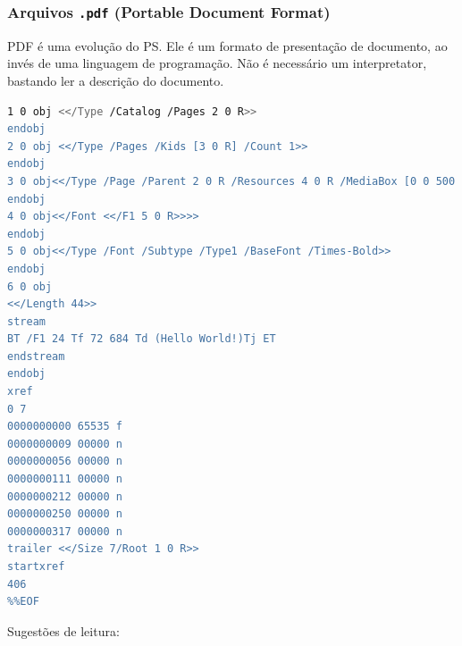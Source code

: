 \begin{frame}
\frametitle{Arquivos \texttt{.pdf} (Portable Document Format)}
PDF é uma evolução do PS. Ele é um formato de presentação de documento, ao invés de uma linguagem de programação.
Não é necessário um interpretator, bastando ler a descrição do documento.

\begin{lstlisting}[language=bash, label=lst-pdf, caption={Exemplo `Hello World!'.}, postbreak=\mbox{$\hookrightarrow$\space}, basicstyle=\fontsize{7}{9}\selectfont\ttfamily]
%PDF-1.4
1 0 obj <</Type /Catalog /Pages 2 0 R>>
endobj
2 0 obj <</Type /Pages /Kids [3 0 R] /Count 1>>
endobj
3 0 obj<</Type /Page /Parent 2 0 R /Resources 4 0 R /MediaBox [0 0 500 800] /Contents 6 0 R>>
endobj
4 0 obj<</Font <</F1 5 0 R>>>>
endobj
5 0 obj<</Type /Font /Subtype /Type1 /BaseFont /Times-Bold>>
endobj
6 0 obj
<</Length 44>>
stream
BT /F1 24 Tf 72 684 Td (Hello World!)Tj ET
endstream
endobj
xref
0 7
0000000000 65535 f
0000000009 00000 n
0000000056 00000 n
0000000111 00000 n
0000000212 00000 n
0000000250 00000 n
0000000317 00000 n
trailer <</Size 7/Root 1 0 R>>
startxref
406
%%EOF
\end{lstlisting}

\end{frame}



\begin{frame}
\small
Sugestões de leitura:
\vspace{2ex}


\vspace{2ex}

\end{frame}

